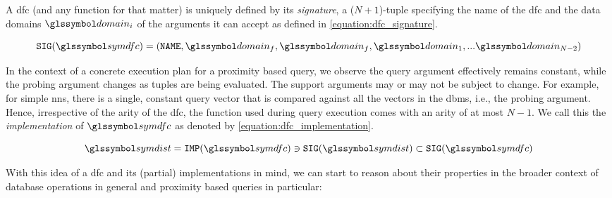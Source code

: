 A \acrshort{dfc} (and any function for that matter) is uniquely defined by its \emph{signature}, a ($N+1$)-tuple specifying the name of the \acrshort{dfc} and the data domains $\domain_i$ of the arguments it can accept as defined in \cref{equation:dfc_signature}.

\begin{equation}
    \label{equation:dfc_signature}
    \texttt{SIG}(\symdfc) = (\mathtt{NAME}, \domain_f, \domain_f, \domain_1,... \domain_{N-2})
\end{equation}

In the context of a concrete execution plan for a proximity based query, we observe the query argument effectively remains constant, while the probing argument changes as tuples are being evaluated. The support arguments may or may not be subject to change. For example, for simple \acrshort{nns}, there is a single, constant query vector that is compared against all the vectors in the \acrshort{dbms}, i.e., the probing argument. Hence, irrespective of the arity of the \acrshort{dfc}, the function used during query execution comes with an arity of at most $N-1$. We call this the \emph{implementation} of $\symdfc$ as denoted by \cref{equation:dfc_implementation}.

\begin{equation}
    \label{equation:dfc_implementation}
    \symdist = \texttt{IMP}(\symdfc) \ni \texttt{SIG}(\symdist) \subset \texttt{SIG}(\symdfc)
\end{equation}

With this idea of a \acrshort{dfc} and its (partial) implementations in mind, we can start to reason about their properties in the broader context of database operations in general and proximity based queries in particular:

